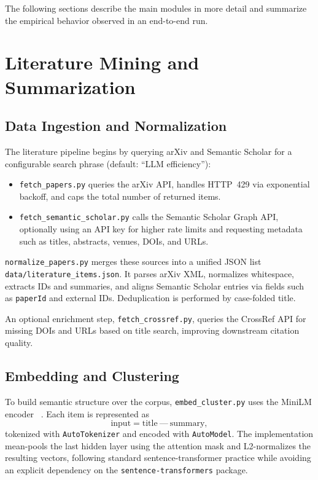 \documentclass[11pt]{article}
\begin{document}
The following sections describe the main modules in more detail and summarize the empirical behavior observed in an end-to-end run.

\section{Literature Mining and Summarization}
\label{sec:literature}

\subsection{Data Ingestion and Normalization}

The literature pipeline begins by querying arXiv and Semantic Scholar for a configurable search phrase (default: ``LLM efficiency''):

\begin{itemize}[leftmargin=1.5em]
\item \verb|fetch_papers.py| queries the arXiv API, handles HTTP~429 via exponential backoff, and caps the total number of returned items.
\item \verb|fetch_semantic_scholar.py| calls the Semantic Scholar Graph API, optionally using an API key for higher rate limits and requesting metadata such as titles, abstracts, venues, DOIs, and URLs.
\end{itemize}

\verb|normalize_papers.py| merges these sources into a unified JSON list \verb|data/literature_items.json|. It parses arXiv XML, normalizes whitespace, extracts IDs and summaries, and aligns Semantic Scholar entries via fields such as \verb|paperId| and external IDs. Deduplication is performed by case-folded title.

An optional enrichment step, \verb|fetch_crossref.py|, queries the CrossRef API for missing DOIs and URLs based on title search, improving downstream citation quality.

\subsection{Embedding and Clustering}

To build semantic structure over the corpus, \verb|embed_cluster.py| uses the MiniLM encoder ~\citep{reimers2019sentencebert}. Each item is represented as
\[
\text{input} = \text{title} \ \text{---} \ \text{summary},
\]
tokenized with \verb|AutoTokenizer| and encoded with \verb|AutoModel|. The implementation mean-pools the last hidden layer using the attention mask and L2-normalizes the resulting vectors, following standard sentence-transformer practice while avoiding an explicit dependency on the \verb|sentence-transformers| package.
\end{document}

